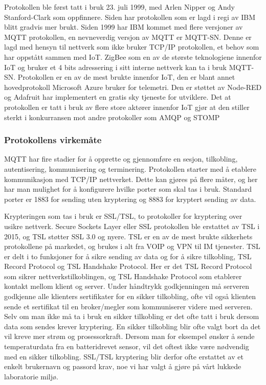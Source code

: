 \documentclass{article}
\begin{document}
Protokollen ble først tatt i bruk 23. juli 1999\cite{firstmqtt}, med Arlen Nipper og Andy Stanford-Clark som oppfinnere. Siden har protokollen som er lagd i regi av IBM blitt gradvis mer brukt. Siden 1999 har IBM kommet med flere versjoner av MQTT protokollen, en nevneverdig versjon av MQTT er MQTT-SN. Denne er lagd med hensyn til nettverk som ikke bruker TCP/IP protokollen, et behov som har oppstått sammen med IoT. ZigBee som en av de største teknologiene innenfor IoT og bruker et 4 bits adressering i sitt interne nettverk kan ta i bruk MQTT-SN. Protokollen er en av de mest brukte innenfor IoT, den er blant annet hovedprotokoll Microsoft Azure bruker for telemetri. Den er støttet av Node-RED og Adafruit har implementert en gratis sky tjeneste for utviklere. Det at protokollen er tatt i bruk av flere store aktører innenfor IoT gjør at den stiller sterkt i konkurransen mot andre protokoller som AMQP og STOMP

\subsubsection{Protokollens virkemåte}

MQTT har fire stadier for å opprette og gjennomføre en sesjon, tilkobling, autentisering, kommunisering og terminering. Protokollen starter med å etablere kommunikasjon med TCP/IP nettverket. Dette kan gjøres på flere måter, og her har man mulighet for å konfigurere hvilke porter som skal tas i bruk. Standard porter er 1883 for sending uten kryptering og 8883 for kryptert sending av data. 

Krypteringen som tas i bruk er SSL/TSL, to protokoller for kryptering over usikre nettverk. Secure Sockets Layer eller SSL protokollen ble erstattet av TSL i 2015, og TSL støtter SSL 3.0 og nyere. TSL er en av de mest brukte sikkerhets protokollene på markedet, og brukes i alt fra VOIP og VPN til IM tjenester. TSL er delt i to funksjoner for å sikre sending av data og for å sikre tilkobling, TSL Record Protocol og TSL Handshake Protocol. Her er det TSL Record Protocol som sikrer nettverkstilkoblingen, og TSL Handshake Protocol som etablerer kontakt mellom klient og server. Under håndtrykk godkjenningen må serveren godkjenne alle klienters sertifikater for en sikker tilkobling, ofte vil også klienten sende et sertifikat til en broker/megler som kommuniserer videre med serveren. Selv om man ikke må ta i bruk en sikker tilkobling er det ofte tatt i bruk dersom data som sendes krever kryptering. En sikker tilkobling blir ofte valgt bort da det vil kreve mer strøm og prosessorkraft. Dersom man for eksempel ønsker å sende temperaturdata fra en batteridrevet sensor, vil det oftest ikke være nødvendig med en sikker tilkobling. SSL/TSL kryptering blir derfor ofte erstattet av et enkelt brukernavn og passord krav, noe vi har valgt å gjøre på vårt lukkede laboratorie miljø.
\end{document}
